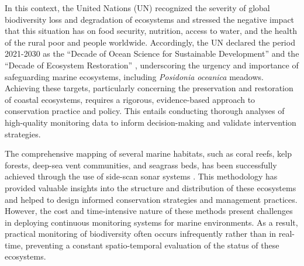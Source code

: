 In this context, the United Nations (UN) recognized the severity of global
biodiversity loss and degradation of ecosystems and stressed the negative
impact that this situation has on food security, nutrition, access to water,
and the health of the rural poor and people worldwide. Accordingly, the UN
declared the period 2021-2030 as the ``Decade of Ocean Science for Sustainable
Development'' and the ``Decade of Ecosystem Restoration'' \cite{UNdecade2000,
    UNRio}, underscoring the urgency and importance of safeguarding marine
ecosystems, including \textit{Posidonia oceanica} meadows. Achieving these
targets, particularly concerning the preservation and restoration of coastal
ecosystems, requires a rigorous, evidence-based approach to
conservation practice and policy. This entails conducting thorough analyses of
high-quality monitoring data to inform decision-making and validate
intervention strategies.

The comprehensive mapping of several marine habitats,
such as coral reefs, kelp forests, deep-sea vent communities, and seagrass
beds, has been successfully achieved through the use of side-scan sonar systems
\cite{Mumby2002, Mishra2006, LeQuilleuc2022, allen-coral-atlas}. This
methodology has provided valuable insights into the structure and distribution
of these ecosystems and helped to design informed conservation strategies and
management practices. However, the cost and time-intensive nature of these
methods present challenges in deploying continuous monitoring systems for
marine environments. As a result, practical monitoring of biodiversity often
occurs infrequently rather than in real-time, preventing a constant
spatio-temporal evaluation of the status of these ecosystems.


